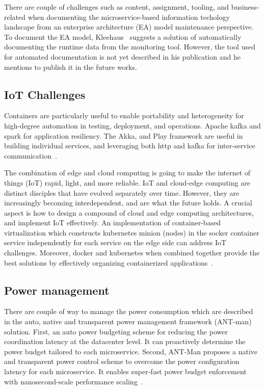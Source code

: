 \par There are couple of challenges such as content, assignment, tooling, and business-related when documenting the microservice-based information techology landscape from an enterprise architecture (EA) model maintenance perspective. To document the EA model, Kleehaus~\cite{kleehaus2019} suggests a solution of automatically documenting the runtime data from the monitoring tool. However, the tool used for automated documentation is not yet described in his publication and he mentions to publish it in the future works.



\subsection{IoT Challenges}%
Containers are particularly useful to enable portability and heterogeneity for high-degree automation in testing, deployment, and operations. Apache kafka and spark for application resiliency.
The Akka, and Play framework are useful in building individual services, and leveraging both http and kafka for inter-service communication~\cite{khan2017}.

\par The combination of edge and cloud computing is going to make the internet of things (IoT) rapid, light, and more reliable. IoT and cloud-edge computing are distinct disciples that have evolved separately over time. However, they are increasingly becoming interdependent, and are what the future holds. A crucial aspect is how to design a compound of cloud and edge computing architectures, and implement IoT effectively.
An implementation of container-based virtualization which constructs kubernetes minion (nodes) in the socker container service independently for each service on the edge side can address IoT challenges. Moreover, docker and kubernetes when combined together provide the best solutions by effectively organizing containerized applications~\cite{Kristiani2020}.



\subsection{Power management}%
There are couple of way to manage the power consumption which are described in the auto, native and transparent power management framework (ANT-man) solution. 
First, an auto power budgeting scheme for reducing the power coordination latency at the datacenter level. It can proactively determine the power budget tailored to each microservice. Second, ANT-Man proposes a native and transparent power control scheme to overcome the power configuration latency for each microservice. It enables super-fast power budget enforcement with nanosecond-scale performance scaling~\cite{Hou2020}.

